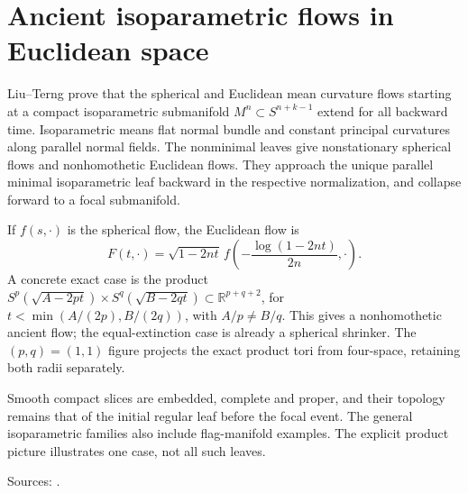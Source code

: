 \chapter{Ancient isoparametric flows in Euclidean space}\label{sec:catalogue-isoparametric-ancient-euclidean}
\begin{example}\label{ex:catalogue-isoparametric-ancient-euclidean}
Liu--Terng prove that the spherical and Euclidean mean curvature flows starting at a compact isoparametric submanifold $M^n\subset S^{n+k-1}$ extend for all backward time. Isoparametric means flat normal bundle and constant principal curvatures along parallel normal fields. The nonminimal leaves give nonstationary spherical flows and nonhomothetic Euclidean flows. They approach the unique parallel minimal isoparametric leaf backward in the respective normalization, and collapse forward to a focal submanifold.

If $f(s,\cdot)$ is the spherical flow, the Euclidean flow is
\[
 F(t,\cdot)=\sqrt{1-2nt}\,f\left(-\frac{\log(1-2nt)}{2n},\cdot\right).
\]
A concrete exact case is the product $S^p(\sqrt{A-2pt})\times S^q(\sqrt{B-2qt})\subset\mathbb R^{p+q+2}$, for $t<\min(A/(2p),B/(2q))$, with $A/p\ne B/q$. This gives a nonhomothetic ancient flow; the equal-extinction case is already a spherical shrinker. The $(p,q)=(1,1)$ figure projects the exact product tori from four-space, retaining both radii separately.

Smooth compact slices are embedded, complete and proper, and their topology remains that of the initial regular leaf before the focal event. The general isoparametric families also include flag-manifold examples. The explicit product picture illustrates one case, not all such leaves.
\par Sources: \cite{CatLiuTerng2020}.
\end{example}

